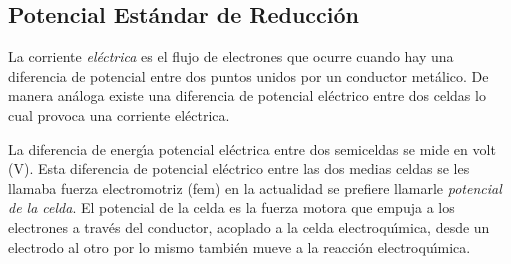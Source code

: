 \subsection{Potencial Est\'andar de Reducci\'on}
La corriente \textit{el\'ectrica} es el flujo de  electrones que ocurre cuando hay una diferencia de potencial entre dos puntos unidos por un conductor met\'alico. De manera an\'aloga existe una diferencia de potencial el\'ectrico entre dos celdas  lo cual provoca una corriente el\'ectrica.

La diferencia de energ\'{\i}a potencial el\'ectrica entre dos semiceldas  se mide en volt (V). Esta diferencia de potencial el\'ectrico entre las dos medias celdas se les llamaba fuerza electromotriz (\gls{fem}) en la actualidad se prefiere llamarle \textit{potencial de la celda}. El potencial de la celda es la fuerza motora que empuja a los electrones a trav\'es del conductor, acoplado a la celda electroqu\'{\i}mica, desde un electrodo al otro por lo mismo tambi\'en mueve a la reacci\'on electroqu\'{\i}mica.

